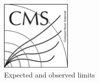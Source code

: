 \begin{figure}[!Hhtbp]
  \begin{center}
    \includegraphics[width=0.3\textwidth]{figs/CMSlogo.png}
    \caption{Expected and observed limits}
    \label{fig:Lim}
  \end{center}
\end{figure}\clearpage
